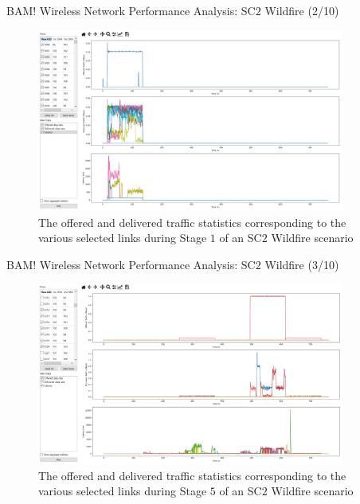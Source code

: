\documentclass{beamer}
\begin{document}
\begin{frame}{BAM! Wireless Network Performance Analysis: SC$2$ Wildfire (2/10)}
\begin{figure}
    \centering
    \includegraphics[width = 0.90\textwidth]{Wildfire_NET.PNG}
    \caption{The offered and delivered traffic statistics corresponding to the various selected links during Stage $1$ of an SC$2$ Wildfire scenario}
    \label{fig:20}
\end{figure}
\end{frame}
\begin{frame}{BAM! Wireless Network Performance Analysis: SC$2$ Wildfire (3/10)}
\begin{figure}
    \centering
    \includegraphics[width = 0.90\textwidth]{Wildfire_NET_2.PNG}
    \caption{The offered and delivered traffic statistics corresponding to the various selected links during Stage $5$ of an SC$2$ Wildfire scenario}
    \label{fig:21}
\end{figure}
\end{frame}
\end{document}
